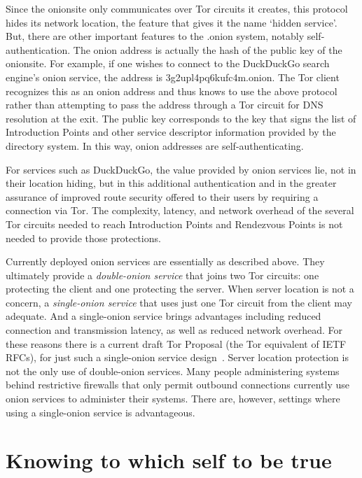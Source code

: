 \documentclass[10pt, conference, compsocconf]{styles/IEEEtran}
\begin{document}
Since the onionsite only communicates over Tor circuits it creates,
this protocol hides its network location, the feature that
gives it the name `hidden service'. But, there are other important
features to the .onion system, notably self-authentication. The onion
address is actually the hash of the public key of the onionsite. For
example, if one wishes to connect to the DuckDuckGo search engine's
onion service, the address is 3g2upl4pq6kufc4m.onion. The Tor client
recognizes this as an onion address and thus knows to use the above
protocol rather than attempting to pass the address through a Tor
circuit for DNS resolution at the exit. The public key
corresponds to the key that signs the list of Introduction Points
and other service descriptor information provided by the directory
system. In this way, onion addresses are self-authenticating.


For services such as DuckDuckGo, the value provided by onion services
lie, not in their location hiding, but in this additional
authentication and in the greater assurance of improved route security
offered to their users by requiring a connection via Tor. The
complexity, latency, and network overhead of the several Tor circuits
needed to reach Introduction Points and Rendezvous Points is not needed
to provide those protections.

Currently deployed onion services are essentially as described above.
They ultimately provide a \emph{double-onion service} that joins two
Tor circuits: one protecting the client and one protecting the
server. When server location is not a concern, a \emph{single-onion
  service} that uses just one Tor circuit from the client may
adequate.  And a single-onion service brings advantages including
reduced connection and transmission latency, as well as reduced
network overhead. For these reasons there is a current draft Tor
Proposal (the Tor equivalent of IETF RFCs), for just such a
single-onion service design~\cite{single-onion-proposal}. Server
location protection is not the only use of double-onion services. Many
people administering systems behind restrictive firewalls that only
permit outbound connections currently use onion services to administer
their systems. There are, however, settings where using a single-onion
service is advantageous.

\section{Knowing to which self to be true}
\end{document}
